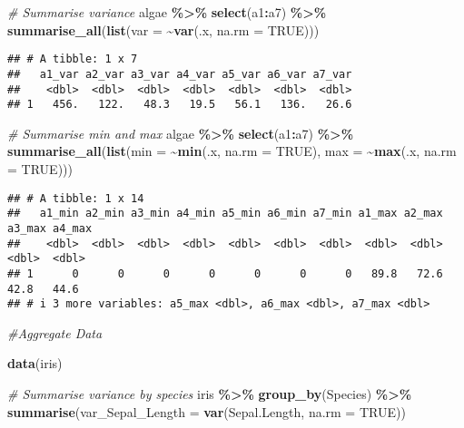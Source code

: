 \documentclass[
]{article}
\newenvironment{Shaded}{\begin{snugshade}}{\end{snugshade}}
\newcommand{\AttributeTok}[1]{\textcolor[rgb]{0.13,0.29,0.53}{#1}}
\newcommand{\CommentTok}[1]{\textcolor[rgb]{0.56,0.35,0.01}{\textit{#1}}}
\newcommand{\ConstantTok}[1]{\textcolor[rgb]{0.56,0.35,0.01}{#1}}
\newcommand{\FunctionTok}[1]{\textcolor[rgb]{0.13,0.29,0.53}{\textbf{#1}}}
\newcommand{\NormalTok}[1]{#1}
\newcommand{\SpecialCharTok}[1]{\textcolor[rgb]{0.81,0.36,0.00}{\textbf{#1}}}
\begin{document}
\begin{Shaded}
\begin{Highlighting}[]
\CommentTok{\# Summarise variance}
\NormalTok{algae }\SpecialCharTok{\%\textgreater{}\%}
  \FunctionTok{select}\NormalTok{(a1}\SpecialCharTok{:}\NormalTok{a7) }\SpecialCharTok{\%\textgreater{}\%}
  \FunctionTok{summarise\_all}\NormalTok{(}\FunctionTok{list}\NormalTok{(}\AttributeTok{var =} \SpecialCharTok{\textasciitilde{}}\FunctionTok{var}\NormalTok{(.x, }\AttributeTok{na.rm =} \ConstantTok{TRUE}\NormalTok{)))}
\end{Highlighting}
\end{Shaded}

\begin{verbatim}
## # A tibble: 1 x 7
##   a1_var a2_var a3_var a4_var a5_var a6_var a7_var
##    <dbl>  <dbl>  <dbl>  <dbl>  <dbl>  <dbl>  <dbl>
## 1   456.   122.   48.3   19.5   56.1   136.   26.6
\end{verbatim}

\begin{Shaded}
\begin{Highlighting}[]
\CommentTok{\# Summarise min and max}
\NormalTok{algae }\SpecialCharTok{\%\textgreater{}\%}
  \FunctionTok{select}\NormalTok{(a1}\SpecialCharTok{:}\NormalTok{a7) }\SpecialCharTok{\%\textgreater{}\%}
  \FunctionTok{summarise\_all}\NormalTok{(}\FunctionTok{list}\NormalTok{(}\AttributeTok{min =} \SpecialCharTok{\textasciitilde{}}\FunctionTok{min}\NormalTok{(.x, }\AttributeTok{na.rm =} \ConstantTok{TRUE}\NormalTok{), }
                     \AttributeTok{max =} \SpecialCharTok{\textasciitilde{}}\FunctionTok{max}\NormalTok{(.x, }\AttributeTok{na.rm =} \ConstantTok{TRUE}\NormalTok{)))}
\end{Highlighting}
\end{Shaded}

\begin{verbatim}
## # A tibble: 1 x 14
##   a1_min a2_min a3_min a4_min a5_min a6_min a7_min a1_max a2_max a3_max a4_max
##    <dbl>  <dbl>  <dbl>  <dbl>  <dbl>  <dbl>  <dbl>  <dbl>  <dbl>  <dbl>  <dbl>
## 1      0      0      0      0      0      0      0   89.8   72.6   42.8   44.6
## # i 3 more variables: a5_max <dbl>, a6_max <dbl>, a7_max <dbl>
\end{verbatim}

\begin{Shaded}
\begin{Highlighting}[]
\CommentTok{\#Aggregate Data}

\FunctionTok{data}\NormalTok{(iris)}

\CommentTok{\# Summarise variance by species}
\NormalTok{iris }\SpecialCharTok{\%\textgreater{}\%}
   \FunctionTok{group\_by}\NormalTok{(Species) }\SpecialCharTok{\%\textgreater{}\%}
   \FunctionTok{summarise}\NormalTok{(}\AttributeTok{var\_Sepal\_Length =} \FunctionTok{var}\NormalTok{(Sepal.Length, }\AttributeTok{na.rm =} \ConstantTok{TRUE}\NormalTok{))}
\end{Highlighting}
\end{Shaded}
\end{document}
